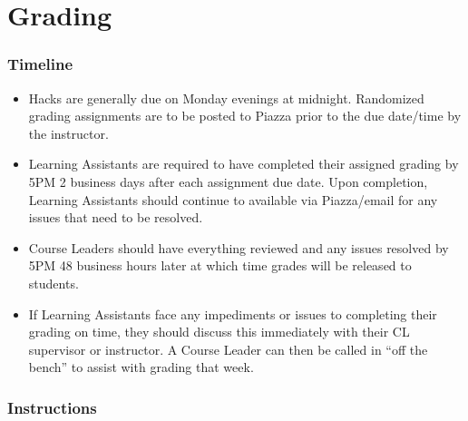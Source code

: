 \documentclass[12pt]{scrartcl}
\begin{document}
\section*{Grading}

\subsubsection*{Timeline}

\begin{itemize}
  \item Hacks are generally due on Monday evenings at midnight.  
    Randomized grading assignments are to 
    be posted to Piazza prior to the due date/time by the instructor.
  \item Learning Assistants are required to have completed their assigned
    grading by 5PM 2 business days after each assignment due date.
    Upon completion, Learning Assistants should continue to available via
    Piazza/email for any issues that need to be resolved.
  \item Course Leaders should have everything reviewed and
    any issues resolved by 5PM 48 business hours later at which time grades
    will be released to students.
  \item If Learning Assistants face any impediments or issues to completing
    their grading on time, they should discuss this immediately with their CL
    supervisor or instructor.  A Course Leader can then be called
    in ``off the bench'' to assist with grading that week.
\end{itemize}

\subsubsection*{Instructions}
\end{document}
